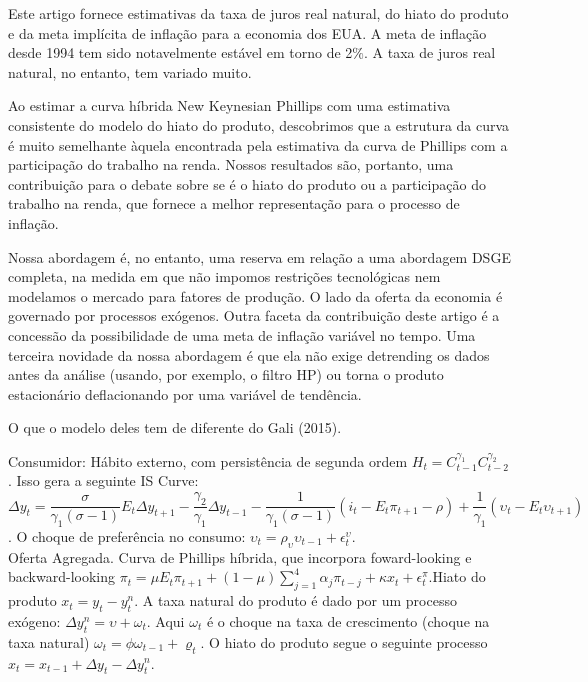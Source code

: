 \documentclass[11pt,oneside,a4paper]{article}
\begin{document}
Este artigo fornece estimativas da taxa de juros real natural, do hiato do produto e da meta implícita de inflação para a economia dos EUA. A meta de inflação desde 1994 tem sido notavelmente estável em torno de 2$\%$. A taxa de juros real natural, no entanto, tem variado muito.

Ao estimar a curva híbrida New Keynesian Phillips com uma estimativa consistente do modelo do hiato do produto, descobrimos que a estrutura da curva é muito semelhante àquela encontrada pela estimativa da curva de Phillips com a participação do trabalho na renda. Nossos resultados são, portanto, uma contribuição para o debate sobre se é o hiato do produto ou a participação do trabalho na renda, que fornece a melhor representação para o processo de inflação.

Nossa abordagem é, no entanto, uma reserva em relação a uma abordagem DSGE completa, na medida em que não impomos restrições tecnológicas nem modelamos o mercado para fatores de produção. O lado da oferta da economia é governado por processos exógenos. Outra faceta da contribuição deste artigo é a concessão da possibilidade de uma meta de inflação variável no tempo. Uma terceira novidade da nossa abordagem é que ela não exige detrending os dados antes da análise (usando, por exemplo, o filtro HP) ou torna o produto estacionário deflacionando por uma variável de tendência.

O que o modelo deles tem de diferente do Gali (2015).

Consumidor: Hábito externo, com persistência de segunda ordem $H_t = C_{t-1}^{\gamma_1}C_{t-2}^{\gamma_2}$. Isso gera a seguinte IS Curve: $\Delta y_t = \dfrac{\sigma}{\gamma_1(\sigma -1 )}E_t \Delta y_{t+1} - \dfrac{\gamma_2}{\gamma_1}\Delta y_{t-1} - \dfrac{1}{\gamma_1 (\sigma -1)}(i_t - E_t \pi_{t+1} - \rho) + \dfrac{1}{\gamma_1}(\upsilon_t - E_t \upsilon_{t+1}) $. O choque de preferência no consumo: $\upsilon_t = \rho_{\upsilon}\upsilon_{t-1} + \epsilon_t^{\upsilon} $. \\

Oferta Agregada. Curva de Phillips híbrida, que incorpora foward-looking e backward-looking $\pi_t = \mu E_t \pi_{t+1} + (1 - \mu) \sum_{j=1}^{4} \alpha_j \pi_{t-j} + \kappa x_t + \epsilon_t^{\pi} $.Hiato do produto $x_t = y_t - y_t^{n}$. A taxa natural do produto é dado por um processo exógeno: $\Delta y_t^{n} = \upsilon + \omega_t $. Aqui $\omega_t$ é o choque na taxa de crescimento (choque na taxa natural) $\omega_t = \phi \omega_{t-1} + \varrho_t $. O hiato do produto segue o seguinte processo $x_t = x_{t-1} + \Delta y_t - \Delta y_t^{n} $.\\
\end{document}
